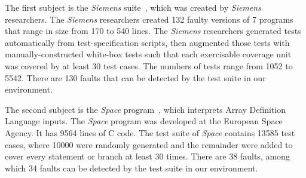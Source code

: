 \documentclass{sig-alternate}
\begin{document}
%

The first subject is the \emph{Siemens} suite~\cite{Hutchins94},
which was created by \emph{Siemens} researchers. The \emph{Siemens}
researchers created 132 faulty versions of 7 programs that range in
size from 170 to 540 lines. The \emph{Siemens} researchers generated
tests automatically from test-specification scripts, then augmented
those tests with manually-constructed white-box tests such that each
exercisable coverage unit was covered by at least 30 test cases. The
numbers of tests range from 1052 to 5542. There are 130 faults that
can be detected by the test suite in our environment.

The second subject is the \emph{Space} program~\cite{Rothermel01},
which interprets Array Definition Language inputs. The \emph{Space}
program was developed at the European Space Agency. It has 9564
lines of C code. The test suite of \emph{Space} contains 13585 test
cases, where 10000 were randomly generated and the remainder were
added to cover every statement or branch at least 30 times. There
are 38 faults, among which 34 faults can be detected by the test
suite in our environment.
\end{document}
